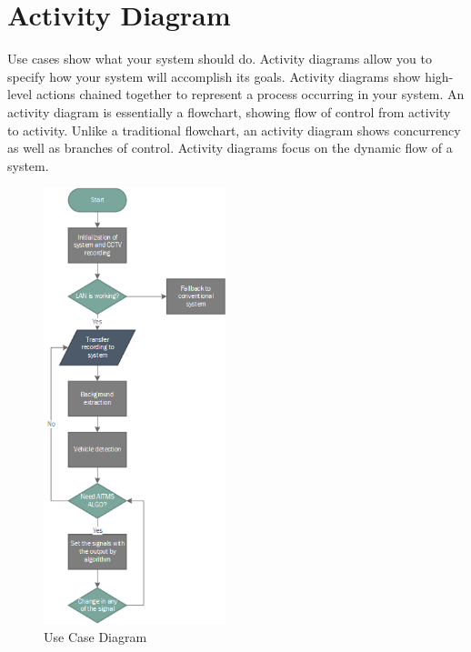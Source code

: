 \documentclass[openany,12pt]{report}
\begin{document}
\section{Activity Diagram}
\hspace*{0.5in}Use cases show what your system should do. Activity diagrams allow you to specify how your system will accomplish its goals. Activity diagrams show high-level actions chained together to represent a process occurring in your system. An activity diagram is essentially a flowchart, showing flow of control from activity to activity. Unlike a traditional flowchart, an activity diagram shows concurrency as well as branches of control. Activity diagrams focus on the dynamic flow of a system.\\

\begin{figure}[H]
\centering
\includegraphics[height=5in]{./diagrams/png/flow}
\caption{Use Case Diagram}
\end{figure}
\newpage
\end{document}
